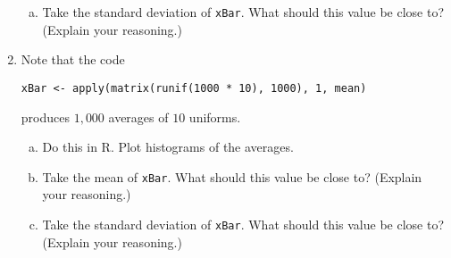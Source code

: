 \documentclass[12pt]{article}
\begin{document}
\begin{enumerate}[Problem 1.]
\begin{enumerate}[a.]
    \item Take the standard deviation of \texttt{xBar}. What should this value be close to? (Explain your reasoning.)
    \end{enumerate}
  \item Note that the code
\begin{verbatim}
xBar <- apply(matrix(runif(1000 * 10), 1000), 1, mean)
\end{verbatim}
    produces $1,000$ averages of $10$ uniforms.
    \begin{enumerate}[a.]
    \item Do this in R. Plot histograms of the averages.
    \item Take the mean of \texttt{xBar}. What should this value be close to? (Explain your reasoning.)
    \item Take the standard deviation of \texttt{xBar}. What should this value be close to? (Explain your reasoning.)
    \end{enumerate}
\end{enumerate}
\end{document}
